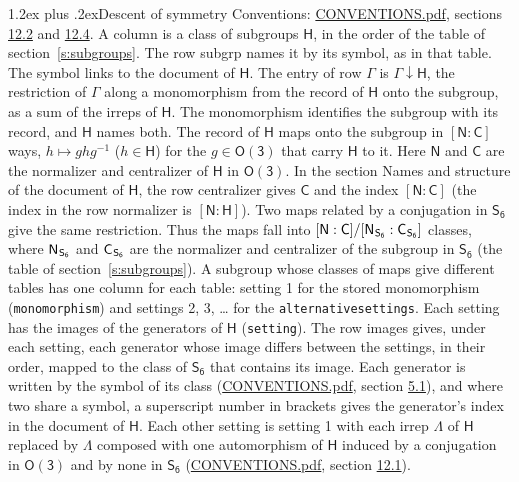 \documentclass[10pt,a4paper]{article}
\makeatletter
\renewcommand\section{\@startsection{section}{1}{\z@}{-3ex plus -1ex minus -.2ex}%
  {1.2ex plus .2ex}{\normalfont\large\sffamily\bfseries\color{parttitle}}}
\numberwithin{equation}{section}
\newcommand{\grp}[1]{\mathsf{#1}}
\newcommand{\grpindex}[2]{[#1 : #2]}
\newcommand{\restr}[2]{#1\!\downarrow#2}
\newcommand{\hairsp}{\mkern1mu}
\makeatother
\begin{document}
\section{Descent of symmetry}\label{s:subduction}
Conventions: \href{../../CONVENTIONS.pdf}{CONVENTIONS.pdf}, sections \href{../../CONVENTIONS.pdf\#conv.12.2}{12.2} and \href{../../CONVENTIONS.pdf\#conv.12.4}{12.4}.
A column is a class of subgroups $\grp{H}$, in the order of the table of section~\ref{s:subgroups}. The row subgrp names it by its symbol, as in that table. The symbol links to the document of $\grp{H}$. The entry of row $\Gamma$ is $\restr{\Gamma}{\grp{H}}$, the restriction of $\Gamma$ along a monomorphism from the record of $\grp{H}$ onto the subgroup, as a sum of the irreps of $\grp{H}$. The monomorphism identifies the subgroup with its record, and $\grp{H}$ names both. \label{n:group.normalizer.o3}\label{n:group.centralizer.o3}The record of $\grp{H}$ maps onto the subgroup in $\grpindex{\grp{N}}{\grp{C}}$ ways, $h \mapsto g h g^{-1}$ ($h \in \grp{H}$) for the $g \in \grp{O(3)}$ that carry $\grp{H}$ to it. Here $\grp{N}$ and $\grp{C}$ are the normalizer and centralizer of $\grp{H}$ in \href{O3.pdf}{$\grp{O(3)}$}. In the section Names and structure of the document of $\grp{H}$, the row centralizer gives $\grp{C}$ and the index $\grpindex{\grp{N}}{\grp{C}}$ (the index in the row normalizer is $\grpindex{\grp{N}}{\grp{H}}$). Two maps related by a conjugation in $\grp{S_{6}}$ give the same restriction. Thus the maps fall into $\grpindex{\grp{N}}{\grp{C}}/\grpindex{\grp{N}_{\hairsp \grp{S_{6}}}}{\grp{C}_{\hairsp \grp{S_{6}}}}$ classes, where $\grp{N}_{\hairsp \grp{S_{6}}}$ and $\grp{C}_{\hairsp \grp{S_{6}}}$ are the normalizer and centralizer of the subgroup in $\grp{S_{6}}$ (the table of section~\ref{s:subgroups}). \label{n:head.setting}A subgroup whose classes of maps give different tables has one column for each table: setting 1 for the stored monomorphism (\texttt{monomorphism}) and settings 2, 3, \dots{} for the \texttt{alternativesettings}. Each setting has the images of the generators of $\grp{H}$ (\texttt{setting}). \label{n:head.images}The row images gives, under each setting, each generator whose image differs between the settings, in their order, mapped to the class of $\grp{S_{6}}$ that contains its image. Each generator is written by the symbol of its class (\href{../../CONVENTIONS.pdf}{CONVENTIONS.pdf}, section \href{../../CONVENTIONS.pdf\#conv.5.1}{5.1}), and where two share a symbol, a superscript number in brackets gives the generator's index in the document of $\grp{H}$. \label{n:irrep.Delta}Each other setting is setting 1 with each irrep $\Lambda$ of $\grp{H}$ replaced by $\Lambda$ composed with one automorphism of $\grp{H}$ induced by a conjugation in \href{O3.pdf}{$\grp{O(3)}$} and by none in $\grp{S_{6}}$ (\href{../../CONVENTIONS.pdf}{CONVENTIONS.pdf}, section \href{../../CONVENTIONS.pdf\#conv.12.1}{12.1}).
\end{document}
